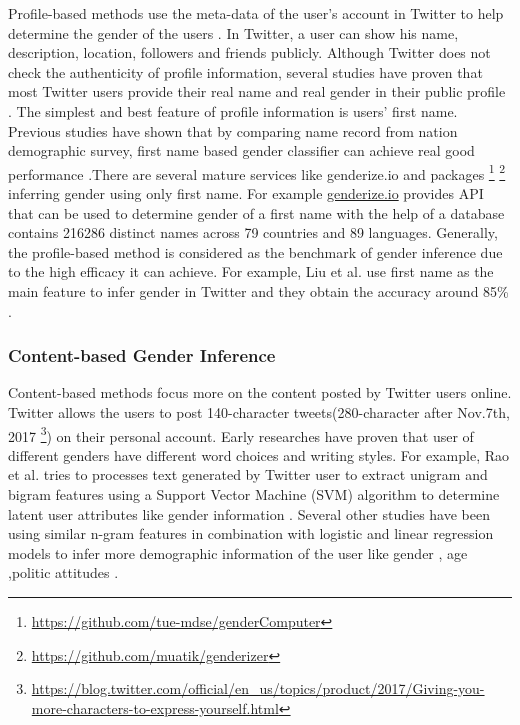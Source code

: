 \documentclass{article}
\begin{document}
Profile-based methods use the meta-data of the user's account in Twitter to help determine the gender of the users \cite{sloan2015tweets}. In Twitter, a user can show his name, description, location, followers and friends publicly. Although Twitter does not check the authenticity of profile information, several studies have proven that most Twitter users provide their real name and real gender in their public profile \cite{cesare2017detection}. The simplest and best feature of profile information is users' first name. Previous studies have shown that by comparing name record from nation demographic survey, first name based gender classifier can achieve real good performance \cite{sloan2013knowing, mislove2011understanding} .There are several mature services like genderize.io and packages \footnote{\url{https://github.com/tue-mdse/genderComputer}} \footnote{\url{https://github.com/muatik/genderizer}} inferring gender using only first name. For example \url{genderize.io} provides API that can be used to determine gender of a first name with the help of a database contains 216286 distinct names across 79 countries and 89 languages.  Generally, the profile-based method is considered as the benchmark of gender inference due to the high efficacy it can achieve.  For example, Liu et al. use first name as the main feature to infer gender in Twitter and they obtain the accuracy around 85\% \cite{liu2013s}. 

\subsubsection{Content-based Gender Inference}

Content-based methods focus more on the content posted by Twitter users online. Twitter allows the users to post 140-character tweets(280-character  after Nov.7th, 2017 \footnote{\url{https://blog.twitter.com/official/en_us/topics/product/2017/Giving-you-more-characters-to-express-yourself.html}}) on their personal account. Early researches have proven that user of different genders have different word choices and writing styles. For example, Rao et al. tries to processes text generated by Twitter user to extract unigram and bigram features using a Support Vector Machine (SVM) algorithm to determine latent user attributes like gender information \cite{rao2010classifying}. Several other studies have been using similar n-gram features in combination with logistic and linear regression models to infer more demographic information of the user like gender \cite{burger2011discriminating}, age \cite{nguyen2013old, nguyen2013tweetgenie} ,politic attitudes \cite{pennacchiotti2011democrats}.
\end{document}
